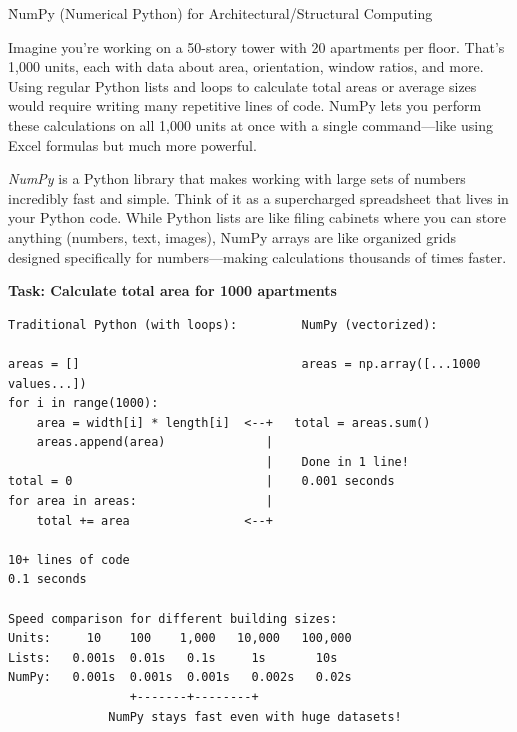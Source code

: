 
\h{NumPy (Numerical Python) for Architectural/Structural Computing}

Imagine you're working on a 50-story tower with 20 apartments per floor. That's 1,000 units, each with data about area, orientation, window ratios, and more. Using regular Python lists and loops to calculate total areas or average sizes would require writing many repetitive lines of code. NumPy lets you perform these calculations on all 1,000 units at once with a single command---like using Excel formulas but much more powerful.

\emph{NumPy} is a Python library that makes working with large sets of numbers incredibly fast and simple. Think of it as a supercharged spreadsheet that lives in your Python code. While Python lists are like filing cabinets where you can store anything (numbers, text, images), NumPy arrays are like organized grids designed specifically for numbers---making calculations thousands of times faster.

\begin{tcolorbox}[
    title=NumPy vs Traditional Approach),
    colframe=black,
    colback = white,
    arc=2mm
]
\textbf{Task: Calculate total area for 1000 apartments}
\begin{lstlisting}[basicstyle=\ttfamily\footnotesize,breaklines=true,columns=fullflexible,keepspaces=true,xleftmargin=0pt]
Traditional Python (with loops):         NumPy (vectorized):
                                         
areas = []                               areas = np.array([...1000 values...])
for i in range(1000):    
    area = width[i] * length[i]  <--+   total = areas.sum()  
    areas.append(area)              |    
                                    |    Done in 1 line!
total = 0                           |    0.001 seconds
for area in areas:                  |    
    total += area                <--+    
                                         
10+ lines of code                       
0.1 seconds                             

Speed comparison for different building sizes:
Units:     10    100    1,000   10,000   100,000
Lists:   0.001s  0.01s   0.1s     1s       10s
NumPy:   0.001s  0.001s  0.001s   0.002s   0.02s
                 +-------+--------+
              NumPy stays fast even with huge datasets!

\end{lstlisting}
\end{tcolorbox}

